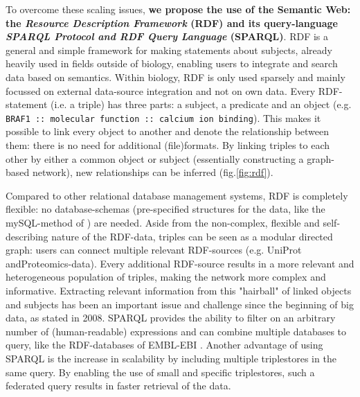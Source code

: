 \documentclass[twoside,fontsize=10pt]{article}
\begin{document}
\noindent
To overcome these scaling issues, \textbf{we propose the use of the Semantic Web: the \textit{Resource Description Framework} (RDF) and its query-language \textit{SPARQL Protocol and RDF Query Language} (SPARQL)}. RDF is a general and simple framework for making statements about subjects, already heavily used in fields outside of biology, enabling users to integrate and search data based on semantics. Within biology, RDF is only used sparsely and mainly focussed on external data-source integration and not on own data\cite{Belleau2008,Neumann2006,Sahoo2008}. Every RDF-statement (i.e. a triple) has three parts: a subject, a predicate and an object (e.g. \lstinline|BRAF1 :: molecular function :: calcium ion binding|). This makes it possible to link every object to another and denote the relationship between them: there is no need for additional (file)formats. By linking triples to each other by either a common object or subject (essentially constructing a graph-based network), new relationships can be inferred (fig.\ref{fig:rdf}). 

Compared to other relational database management systems, RDF is completely flexible: no database-schemas (pre-specified structures for the data, like the mySQL-method of \citet{Low2013}) are needed. Aside from the non-complex, flexible and self-describing nature of the RDF-data, triples can be seen as a modular directed graph: users can connect multiple relevant RDF-sources (e.g. UniProt andProteomics-data). Every additional RDF-source results in a more relevant and heterogeneous population of triples, making the network more complex and informative. Extracting relevant information from this "hairball" of linked objects and subjects has been an important issue and challenge since the beginning of big data, as \citet{Pavlopoulos2008} stated in 2008. SPARQL provides the ability to filter on an arbitrary number of (human-readable) expressions and can combine multiple databases to query, like the RDF-databases of EMBL-EBI \citep{Jupp2014}. Another advantage of using SPARQL is the increase in scalability by including multiple triplestores in the same query. By enabling the use of small and specific triplestores, such a federated query results in faster retrieval of the data.
\end{document}
